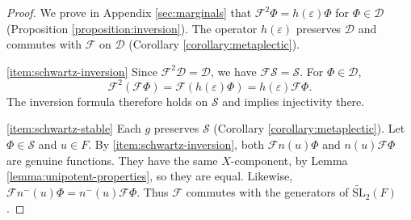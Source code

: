 \documentclass[reqno]{amsart}
\theoremstyle{plain}
\theoremstyle{definition}
\theoremstyle{itplain}
\numberwithin{equation}{section}
\numberwithin{theorem}{section}
\begin{document}
\begin{proof}
  We prove in Appendix \ref{sec:marginals} that $\mathcal{F}^2 \Phi = h(\varepsilon) \Phi$ for $\Phi \in \mathcal{D}$ (Proposition \ref{proposition:inversion}).  The operator $h(\varepsilon)$ preserves $\mathcal{D}$ and commutes with $\mathcal{F}$ on $\mathcal{D}$ (Corollary \ref{corollary:metaplectic}).

  \eqref{item:schwartz-inversion} Since $\mathcal{F}^2 \mathcal{D} = \mathcal{D}$, we have $\mathcal{F}\mathcal{S} = \mathcal{S}$.  For $\Phi \in \mathcal{D}$,
  \begin{equation*}
    \mathcal{F}^2 (\mathcal{F} \Phi) = \mathcal{F} (h(\varepsilon) \Phi) = h(\varepsilon) \mathcal{F} \Phi.
  \end{equation*}
  The inversion formula therefore holds on $\mathcal{S}$ and implies injectivity there.

  \eqref{item:schwartz-stable} Each $g$ preserves $\mathcal{S}$ (Corollary \ref{corollary:metaplectic}).  Let $\Phi \in \mathcal{S}$ and $u \in F$.  By \eqref{item:schwartz-inversion}, both $\mathcal{F} n(u) \Phi$ and $n(u) \mathcal{F} \Phi$ are genuine functions.  They have the same $X$-component, by Lemma \ref{lemma:unipotent-properties}, so they are equal.  Likewise, $\mathcal{F} n^-(u) \Phi = n^-(u) \mathcal{F} \Phi$.  Thus $\mathcal{F}$ commutes with the generators of $\widetilde{\mathrm{SL}}_2(F)$.


\end{proof}
\end{document}
